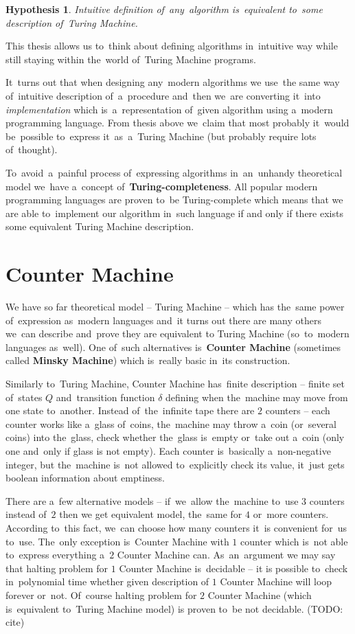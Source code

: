 \documentclass[english,shortabstract,mgr]{iithesis}
\newtheorem*{hypothesis}{Hypothesis}
\begin{document}
\begin{hypothesis}
  Intuitive definition of~any~algorithm is~equivalent to~some description of~Turing Machine.
\end{hypothesis}

This thesis allows us to~think about defining algorithms in~intuitive way while still staying
within the~world of~Turing Machine programs.

It~turns out that when designing any~modern algorithms we use~the same way of~intuitive description
of~a~procedure and~then we~are converting it~into \textit{implementation} which is~a~representation
of~given algorithm using a~modern programming language. From thesis above we~claim that most probably
it~would be~possible to~express it~as~a~Turing Machine (but probably require lots of~thought).

To~avoid~a~painful process of~expressing algorithms in~an~unhandy theoretical model we~have
a~concept of~\textbf{Turing-completeness}. All popular modern programming languages are proven
to~be Turing-complete which means that we are able to~implement our algorithm in~such
language if and only if there exists some equivalent Turing Machine description.

\section{Counter Machine}

We have so far theoretical model -- Turing Machine -- which has the~same power of~expression
as~modern languages and~it turns out there are many others we~can describe and~prove they are
equivalent to Turing Machine (so~to~modern languages as~well). One of~such alternatives
is~\textbf{Counter Machine} (sometimes called \textbf{Minsky Machine}) which is~really basic
in~its construction.

Similarly to~Turing Machine, Counter Machine has~finite description -- finite set of~states $Q$
and~transition function $\delta$ defining when the~machine may move from one state to~another.
Instead of~the~infinite tape there are $2$ counters -- each counter works like a~glass of~coins,
the~machine may throw a~coin (or~several coins) into the~glass, check whether the~glass is~empty
or~take out a~coin (only one and~only if glass is not empty). Each counter is~basically a~non-negative
integer, but the~machine is~not allowed to~explicitly check its value, it~just gets boolean
information about emptiness.

There are a~few alternative models -- if~we~allow the~machine to~use $3$ counters instead of~$2$
then we get equivalent model, the~same for $4$ or~more counters. According to~this fact, we~can
choose how many counters it~is convenient for~us to~use. The~only exception is~Counter Machine with
$1$ counter which is~not able to~express everything a~$2$ Counter Machine can. As~an~argument
we may say that halting problem for $1$ Counter Machine is~decidable -- it is possible to~check
in~polynomial time whether given description of $1$ Counter Machine will loop forever or~not.
Of~course halting problem for $2$ Counter Machine (which is~equivalent to~Turing Machine model)
is proven to~be not decidable. (TODO: cite)
\end{document}
